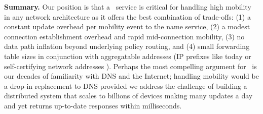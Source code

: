 


{\bf{Summary.}} Our position is that a \logcen\ service is critical for handling high mobility in any network architecture as it offers the best combination of trade-offs: (1) a constant update overhead per mobility event to the name service, (2) a modest connection establishment overhead and rapid mid-connection mobility, (3) no data path inflation beyond underlying policy routing, and (4) small forwarding table sizes in conjunction with aggregatable addresses (IP prefixes like today or self-certifying network addresses \cite{MobilityFirst-UMASS,XIA}). Perhaps the most compelling argument for  \logcen\ is our decades of familiarity with DNS and the Internet; handling mobility would be a drop-in replacement to DNS provided we address the challenge of building a distributed system that scales to billions of devices making many updates a day and yet returns up-to-date responses within milliseconds. %

